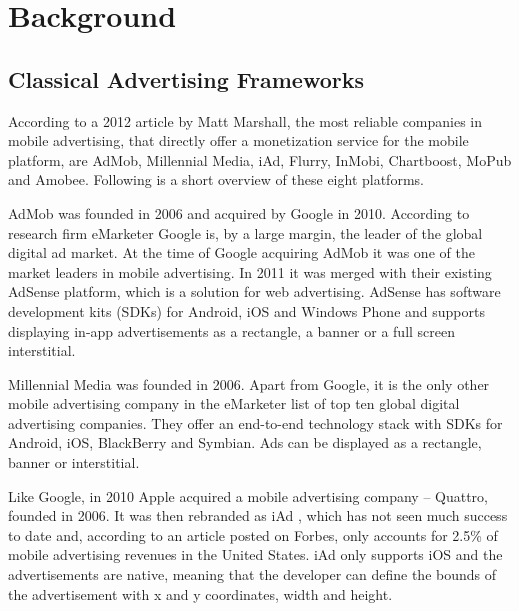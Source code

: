
\chapter{Background}


\section{Classical Advertising Frameworks}

According to a 2012 article by Matt Marshall, the most reliable companies in mobile advertising, that directly offer a monetization service for the mobile platform, are AdMob, Millennial Media, iAd, Flurry, InMobi, Chartboost, MoPub and Amobee. \cite{mmarshall-top10} Following is a short overview of these eight platforms.

AdMob was founded in 2006 and acquired by Google in 2010. \cite{crunchbase-admob} According to research firm eMarketer Google is, by a large margin, the leader of the global digital ad market. \cite{emarketer-google} At the time of Google acquiring AdMob it was one of the market leaders in mobile advertising. \cite{google-admob} In 2011 it was merged with their existing AdSense platform, which is a solution for web advertising. \cite{admob-adsense} AdSense has software development kits (SDKs) for Android, iOS and Windows Phone \cite{admob-sdk}  and supports displaying in-app advertisements as a rectangle, a banner \cite{admob-banner} or a full screen interstitial.\cite{admob-interstitial}

Millennial Media was founded in 2006. \cite{crunchbase-millenial} Apart from Google, it is the only other mobile advertising company in the eMarketer list of top ten global digital advertising companies. \cite{emarketer-google} They offer an end-to-end technology stack with SDKs for Android, iOS, BlackBerry and Symbian. \cite{millenial-sdk} Ads can be displayed as a rectangle, banner or interstitial. \cite{millenial-android}

Like Google, in 2010 Apple acquired a mobile advertising company -- Quattro, founded in 2006. \cite{crunchbase-quattro} It was then rebranded as iAd \cite{forbes-iad}, which has not seen much success to date and, according to an article posted on Forbes, only accounts for 2.5\% of mobile advertising revenues in the United States. \cite{forbes-iad2} iAd only supports iOS and the advertisements are native, meaning that the developer can define the bounds of the advertisement with x and y coordinates, width and height. \cite{iad-tutorial}


